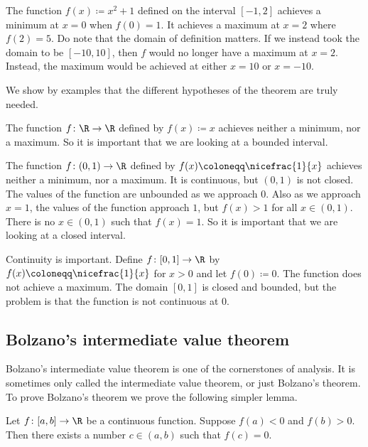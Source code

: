 \begin{example}
The function $f(x) \coloneqq x^2+1$ defined on the interval $[-1,2]$ achieves a minimum
at $x=0$ when $f(0) = 1$.  It achieves a maximum at $x=2$ where $f(2) = 5$.
Do note that the domain of definition matters.  If we instead took the domain
to be $[-10,10]$, then $f$ would no longer have a maximum at $x=2$.
Instead,
the maximum would be achieved at either $x=10$ or $x=-10$.
\end{example}

We show by examples that the different hypotheses of the theorem are
truly needed.

\begin{example}
The function $f \colon \R \to \R$ defined by $f(x) \coloneqq x$
achieves neither a minimum, nor a maximum.  So it is important that
we are looking at a bounded interval.
\end{example}

\begin{example}
The function $f \colon (0,1) \to \R$ defined by $f(x) \coloneqq \nicefrac{1}{x}$
achieves neither a minimum, nor a maximum.
It is continuous, but $(0,1)$ is not closed.
The values of the function are
unbounded as we approach $0$.  Also as we approach $x=1$, the values of the
function approach $1$, but $f(x) > 1$ for all $x \in (0,1)$.  There is
no $x \in (0,1)$ such that $f(x) = 1$.  So it is important that
we are looking at a closed interval.
\end{example}

\begin{example}
Continuity is important.
Define $f \colon [0,1] \to \R$ by 
$f(x) \coloneqq \nicefrac{1}{x}$ for $x > 0$ and let $f(0) \coloneqq 0$.
The function does not achieve a maximum.  The domain $[0,1]$ is closed and
bounded, but the problem is that
the function is not continuous at 0.
\end{example}

\subsection{Bolzano's intermediate value theorem}

Bolzano's intermediate value theorem is one of the cornerstones of analysis.
It is sometimes only called the intermediate value theorem, or just
Bolzano's theorem.  To prove Bolzano's theorem we prove the
following simpler lemma.

\begin{lemma} \label{IVT:lemma}
Let $f \colon [a,b] \to \R$ be a continuous function.
Suppose $f(a) < 0$ and $f(b) > 0$. 
Then there exists a number $c \in (a,b)$
such that $f(c) = 0$.
\end{lemma}

